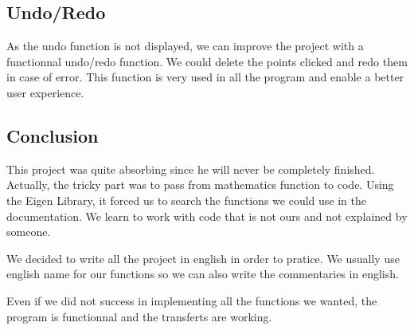 \documentclass{report}
\begin{document}
\textcolor{subtitle}{\subsection{Undo/Redo}}
As the undo function is not displayed, we can improve the project with a functionnal undo/redo function. We could delete the points clicked and redo them in case of error. This function is very used in all the program and enable a better user experience. 

\newpage
\textcolor{title}{\section*{Conclusion}}
This project was quite absorbing since he will never be completely finished. Actually, the tricky part was to pass from mathematics function to code. Using the Eigen Library, it forced us to search the functions we could use in the documentation. We learn to work with code that is not ours and not explained by someone. 



We decided to write all the project in english in order to pratice. We usually use english name for our functions so we can also write the commentaries in english. 

Even if we did not success in implementing all the functions we wanted, the program is functionnal and the transferts are working. 
\end{document}
